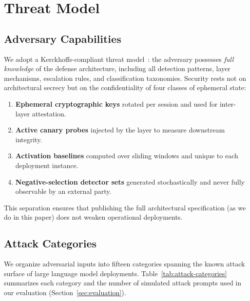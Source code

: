 \section{Threat Model}
\label{sec:threat}

\subsection{Adversary Capabilities}

We adopt a Kerckhoffs-compliant threat model~\cite{kerckhoffs1883}: the adversary possesses
\emph{full knowledge} of the \sentinel{} defense architecture, including all
detection patterns, layer mechanisms, escalation rules, and classification
taxonomies. Security rests not on architectural secrecy but on the
confidentiality of four classes of ephemeral state:

\begin{enumerate}
    \item \textbf{Ephemeral cryptographic keys} rotated per session and used
          for inter-layer attestation.
    \item \textbf{Active canary probes} injected by the \tsa{} layer to
          measure downstream integrity.
    \item \textbf{Activation baselines} computed over sliding windows and
          unique to each deployment instance.
    \item \textbf{Negative-selection detector sets} generated stochastically
          and never fully observable by an external party.
\end{enumerate}

\noindent
This separation ensures that publishing the full architectural specification
(as we do in this paper) does not weaken operational deployments.

\subsection{Attack Categories}

We organize adversarial inputs into fifteen categories spanning the known
attack surface of large language model deployments.
Table~\ref{tab:attack-categories} summarizes each category and the number of
simulated attack prompts used in our evaluation (Section~\ref{sec:evaluation}).

